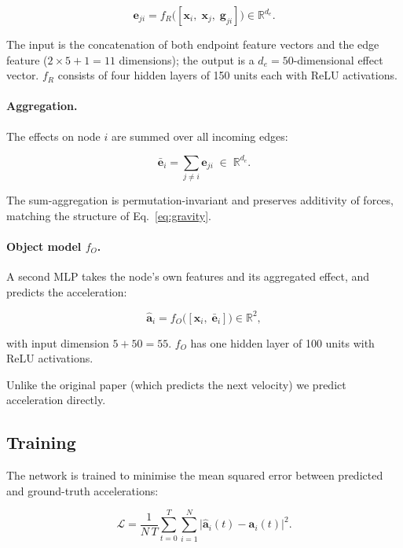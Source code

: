 \documentclass[11pt, a4paper]{article}
\begin{document}
\begin{equation}
    \mathbf{e}_{ji} = f_R\!\bigl([\mathbf{x}_i,\;\mathbf{x}_j,\;\mathbf{g}_{ji}]\bigr) \in \mathbb{R}^{d_e}.
\end{equation}

The input is the concatenation of both endpoint feature vectors and the edge feature
($2\times 5 + 1 = 11$ dimensions); the output is a $d_e = 50$-dimensional effect vector.
$f_R$ consists of four hidden layers of 150 units each with ReLU activations.

\paragraph{Aggregation.}
The effects on node $i$ are summed over all incoming edges:

\begin{equation}
    \bar{\mathbf{e}}_i = \sum_{j \neq i} \mathbf{e}_{ji} \;\in\; \mathbb{R}^{d_e}.
\end{equation}

The sum-aggregation is permutation-invariant and preserves additivity of forces, matching the
structure of Eq.~\eqref{eq:gravity}.

\paragraph{Object model $f_O$.}
A second MLP takes the node's own features and its aggregated effect, and predicts the acceleration:

\begin{equation}
    \hat{\mathbf{a}}_i = f_O\!\bigl([\mathbf{x}_i,\;\bar{\mathbf{e}}_i]\bigr) \in \mathbb{R}^2,
\end{equation}

with input dimension $5 + 50 = 55$.
$f_O$ has one hidden layer of 100 units with ReLU activations.

Unlike the original paper (which predicts the next velocity) we predict acceleration directly.

\subsection{Training}

The network is trained to minimise the mean squared error between predicted and ground-truth accelerations:

\begin{equation}
    \mathcal{L} = \frac{1}{N\,T}\sum_{t=0}^{T}\sum_{i=1}^{N}
        \bigl|\hat{\mathbf{a}}_i(t) - \mathbf{a}_i(t)\bigr|^2.
\end{equation}
\end{document}
